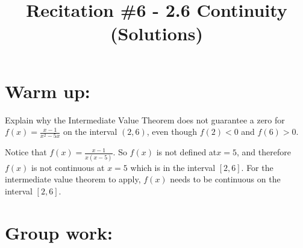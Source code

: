 \documentclass[nooutcomes]{ximera}
\title{Recitation \#6 - 2.6 Continuity (Solutions)}
\begin{document}
\begin{abstract}		\end{abstract}
\maketitle

\section*{Warm up:} 
Explain why the Intermediate Value Theorem does not guarantee a zero for $f(x) = \frac{x-1}{x^2 - 5x}$ on the interval $(2,6)$, even though $f(2) < 0$ and $f(6) > 0$.  

	\begin{freeResponse}
	Notice that $f(x) = \frac{x-1}{x(x-5)}$.  So $f(x)$ is not defined at$x=5$, and therefore $f(x)$ is not continuous at $x=5$ which is in the interval $[2,6]$.  For the intermediate value theorem to apply, $f(x)$ needs to be continuous on the interval $[2,6]$.  
	\end{freeResponse}
	
	

\section*{Group work:}
\end{document}
